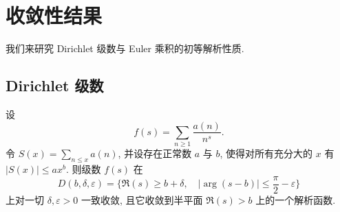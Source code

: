 \section{收敛性结果}\label{sec:VI.2}

我们来研究 Dirichlet 级数与 Euler 乘积的初等解析性质.

\subsection*{Dirichlet 级数}

\begin{proposition}\label{prop:vi.2.1}
设
\[
f(s)=\sum_{n\ge1}\frac{a(n)}{n^{s}}.
\]
令 $S(x)=\sum_{n\le x}a(n)$, 并设存在正常数 $a$ 与 $b$, 使得对所有充分大的 $x$ 有 $|S(x)|\le ax^{b}$. 则级数 $f(s)$ 在
\[
D(b,\delta,\varepsilon)=\{\Re(s)\ge b+\delta,\quad|\arg(s-b)|\le\frac{\pi}{2}-\varepsilon\}
\]
上对一切 $\delta,\varepsilon>0$ 一致收敛, 且它收敛到半平面 $\Re(s)>b$ 上的一个解析函数.
\end{proposition}

